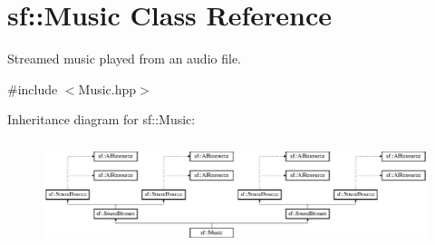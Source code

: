 \hypertarget{classsf_1_1_music}{\section{sf\-:\-:Music Class Reference}
\label{classsf_1_1_music}
}


Streamed music played from an audio file.  




{\ttfamily \#include $<$Music.\-hpp$>$}

Inheritance diagram for sf\-:\-:Music\-:\begin{figure}[H]
\begin{center}
\leavevmode
\includegraphics[height=3.097345cm]{classsf_1_1_music}
\end{center}
\end{figure}
